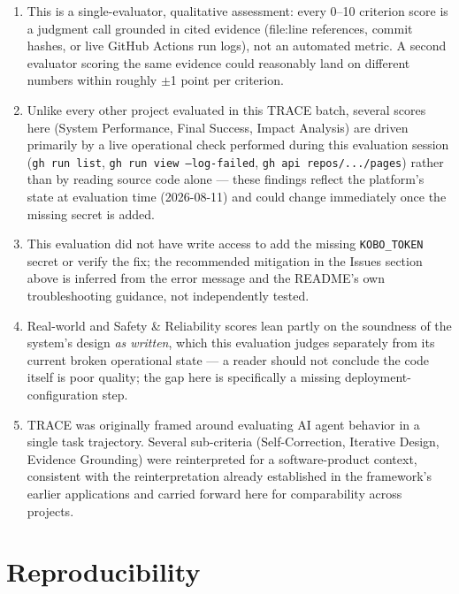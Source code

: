 \documentclass[12pt, a4paper]{article}
\newcounter{finding}
\begin{document}
\begin{enumerate}[itemsep=4pt]
  \item This is a single-evaluator, qualitative assessment: every 0--10 criterion score is a judgment call grounded in cited evidence (file:line references, commit hashes, or live GitHub Actions run logs), not an automated metric. A second evaluator scoring the same evidence could reasonably land on different numbers within roughly $\pm$1 point per criterion.
  \item Unlike every other project evaluated in this TRACE batch, several scores here (System Performance, Final Success, Impact Analysis) are driven primarily by a live operational check performed during this evaluation session (\texttt{gh run list}, \texttt{gh run view --log-failed}, \texttt{gh api repos/.../pages}) rather than by reading source code alone --- these findings reflect the platform's state at evaluation time (2026-08-11) and could change immediately once the missing secret is added.
  \item This evaluation did not have write access to add the missing \texttt{KOBO\_TOKEN} secret or verify the fix; the recommended mitigation in the Issues section above is inferred from the error message and the README's own troubleshooting guidance, not independently tested.
  \item Real-world and Safety \& Reliability scores lean partly on the soundness of the system's design \emph{as written}, which this evaluation judges separately from its current broken operational state --- a reader should not conclude the code itself is poor quality; the gap here is specifically a missing deployment-configuration step.
  \item TRACE was originally framed around evaluating AI agent behavior in a single task trajectory. Several sub-criteria (Self-Correction, Iterative Design, Evidence Grounding) were reinterpreted for a software-product context, consistent with the reinterpretation already established in the framework's earlier applications and carried forward here for comparability across projects.
\end{enumerate}

\clearpage

\section{Reproducibility}
\end{document}
